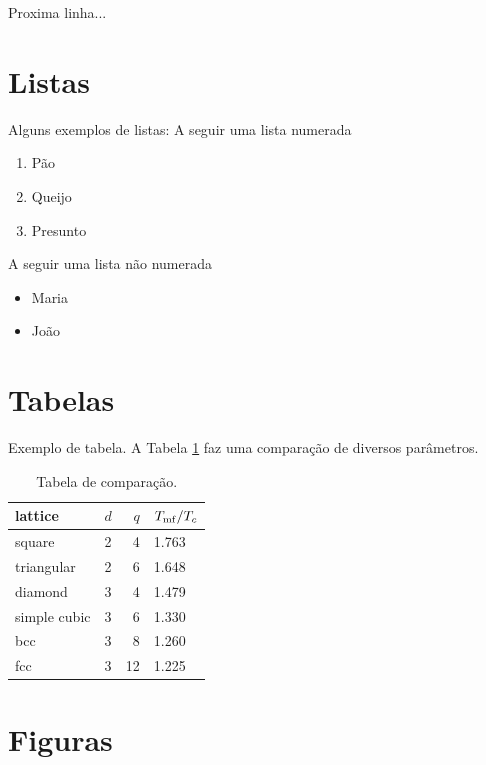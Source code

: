 \documentclass[portuguese,brazilian,12pt,final]{article}
\begin{document}
Proxima linha...

\section{Listas}

Alguns exemplos de listas: A seguir uma lista numerada

\begin{enumerate}
\item Pão
\item Queijo
\item Presunto
\end{enumerate}

A seguir uma lista não numerada

\begin{itemize}
\item Maria
\item João
\end{itemize}



\section{Tabelas}
Exemplo de tabela. A Tabela \ref{tab:comparacao} faz uma comparação de diversos parâmetros.

\begin{table}[h]
\begin{center}
\caption{Tabela de comparação.}
\label{tab:comparacao}
\begin{tabular}{|l|l|r|l|}
\hline
lattice & $d$ & $q$ & $T_{\rm mf}/T_c$ \\
\hline
square & 2 & 4 & 1.763 \\
\hline
triangular & 2 & 6 & 1.648 \\
\hline
diamond & 3 & 4 & 1.479 \\
\hline
simple cubic & 3 & 6 & 1.330 \\
\hline
bcc & 3 & 8 & 1.260 \\
\hline
fcc & 3 & 12 & 1.225 \\
\hline
\end{tabular}
\end{center}
\end{table}





\section{Figuras}
\end{document}
